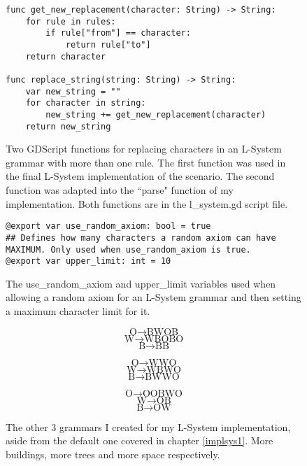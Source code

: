 \begin{figure}[H]
    \centering
    \begin{lstlisting}
func get_new_replacement(character: String) -> String:
	for rule in rules:
		if rule["from"] == character:
			return rule["to"]
	return character

func replace_string(string: String) -> String:
	var new_string = ""
	for character in string:
		new_string += get_new_replacement(character)
	return new_string
    \end{lstlisting}
    \caption{Two GDScript functions for replacing characters in an L-System grammar with more than one rule. The first function was used in the final L-System implementation of the scenario. The second function was adapted into the ``parse" function of my implementation. Both functions are in the l\_system.gd script file.}
    \label{fig:lsystem2}
\end{figure}

\begin{figure}[H]
    \centering
    \begin{lstlisting}
@export var use_random_axiom: bool = true
## Defines how many characters a random axiom can have MAXIMUM. Only used when use_random_axiom is true.
@export var upper_limit: int = 10
    \end{lstlisting}
    \caption{The use\_random\_axiom and upper\_limit variables used when allowing a random axiom for an L-System grammar and then setting a maximum character limit for it.}
    \label{fig:lsystem3}
\end{figure}

\begin{figure}[H]
    \centering
    $$ \mbox{O} \rightarrow \mbox{B}\mbox{W}\mbox{O}\mbox{B} $$
    $$ \mbox{W} \rightarrow \mbox{W}\mbox{B}\mbox{O}\mbox{B}\mbox{O} $$
    $$ \mbox{B} \rightarrow \mbox{B}\mbox{B} $$
    
    $$ \mbox{O} \rightarrow \mbox{W}\mbox{W}\mbox{O} $$ 
    $$ \mbox{W} \rightarrow \mbox{W}\mbox{B}\mbox{W}\mbox{O} $$
    $$ \mbox{B} \rightarrow \mbox{B}\mbox{W}\mbox{W}\mbox{O} $$
    
    $$ \mbox{O} \rightarrow \mbox{O}\mbox{O}\mbox{B}\mbox{W}\mbox{O} $$ 
    $$ \mbox{W} \rightarrow \mbox{O}\mbox{B} $$
    $$ \mbox{B} \rightarrow \mbox{O}\mbox{W} $$
    \caption{The other 3 grammars I created for my L-System implementation, aside from the default one covered in chapter \ref{implsys1}. More buildings, more trees and more space respectively.}
    \label{fig:lsystem4}
\end{figure}


